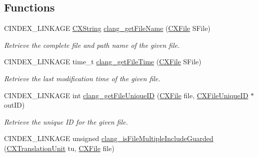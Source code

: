 \subsection*{Functions}
\begin{DoxyCompactItemize}
\item 
\mbox{\label{group__CINDEX__FILES_ga626ff6335ab1e0a2b8c8823301225690}} 
C\+I\+N\+D\+E\+X\+\_\+\+L\+I\+N\+K\+A\+GE \mbox{\hyperlink{structCXString}{C\+X\+String}} \mbox{\hyperlink{group__CINDEX__FILES_ga626ff6335ab1e0a2b8c8823301225690}{clang\+\_\+get\+File\+Name}} (\mbox{\hyperlink{group__CINDEX__FILES_gacfcea9c1239c916597e2e5b3e109215a}{C\+X\+File}} S\+File)
\begin{DoxyCompactList}\small\item\em Retrieve the complete file and path name of the given file. \end{DoxyCompactList}\item 
\mbox{\label{group__CINDEX__FILES_gac8444d2892e0d24fcf71a9dea8a475cb}} 
C\+I\+N\+D\+E\+X\+\_\+\+L\+I\+N\+K\+A\+GE time\+\_\+t \mbox{\hyperlink{group__CINDEX__FILES_gac8444d2892e0d24fcf71a9dea8a475cb}{clang\+\_\+get\+File\+Time}} (\mbox{\hyperlink{group__CINDEX__FILES_gacfcea9c1239c916597e2e5b3e109215a}{C\+X\+File}} S\+File)
\begin{DoxyCompactList}\small\item\em Retrieve the last modification time of the given file. \end{DoxyCompactList}\item 
C\+I\+N\+D\+E\+X\+\_\+\+L\+I\+N\+K\+A\+GE int \mbox{\hyperlink{group__CINDEX__FILES_gafeef0a8288de8c14e95e4d6c249aaf1e}{clang\+\_\+get\+File\+Unique\+ID}} (\mbox{\hyperlink{group__CINDEX__FILES_gacfcea9c1239c916597e2e5b3e109215a}{C\+X\+File}} file, \mbox{\hyperlink{structCXFileUniqueID}{C\+X\+File\+Unique\+ID}} $\ast$out\+ID)
\begin{DoxyCompactList}\small\item\em Retrieve the unique ID for the given {\ttfamily file}. \end{DoxyCompactList}\item 
\mbox{\label{group__CINDEX__FILES_ga1969fe907a40d9469ea68c370d0f602a}} 
C\+I\+N\+D\+E\+X\+\_\+\+L\+I\+N\+K\+A\+GE unsigned \mbox{\hyperlink{group__CINDEX__FILES_ga1969fe907a40d9469ea68c370d0f602a}{clang\+\_\+is\+File\+Multiple\+Include\+Guarded}} (\mbox{\hyperlink{group__CINDEX_gacdb7815736ca709ce9a5e1ec2b7e16ac}{C\+X\+Translation\+Unit}} tu, \mbox{\hyperlink{group__CINDEX__FILES_gacfcea9c1239c916597e2e5b3e109215a}{C\+X\+File}} file)

\end{DoxyCompactItemize}
